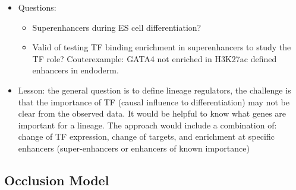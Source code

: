 \documentclass{report}
\begin{document}
\begin{itemize}
	\item Questions:
	\begin{itemize}
		\item Superenhancers during ES cell differentiation? 
		\item Valid of testing TF binding enrichment in superenhancers to study the TF role? Couterexample: GATA4 not enriched in H3K27ac defined enhancers in endoderm. 
	\end{itemize}
	\item Lesson: the general question is to define lineage regulators, the challenge is that the importance of TF (causal influence to differentiation) may not be clear from the observed data. It would be helpful to know what genes are important for a lineage. The approach would include a combination of: change of TF expression, change of targets, and enrichment at specific enhancers (super-enhancers or enhancers of known importance)
\end{itemize}
\subsection{Occlusion Model}
\end{document}
